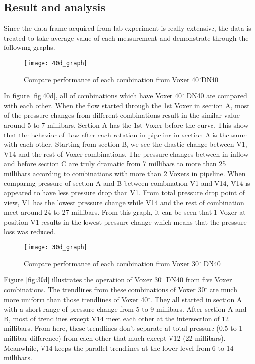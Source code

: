 \subsection{Result and analysis}
Since the data frame acquired from lab experiment is really extensive, the data is treated to take average value of each measurement and demonstrate through the following graphs.
\begin{figure}[h]
  \centering
  \texttt{[image: 40d\_graph]}
  \caption{ Compare performance of each combination from Voxer 40$^{\circ}$DN40}
  \label{fig:40d}
\end{figure}
In figure \vref{fig:40d}, all of combinations which have Voxer 40$^{\circ}$ DN40 are compared with each other. When the flow started through the 1st Voxer in section A, most of the pressure changes from different combinations result in the similar value around 5 to 7 millibars. Section A has the 1st Voxer before the curve. This show that the behavior of flow after each rotation in pipeline in section A is the same with each other. Starting from section B, we see the drastic change between V1, V14 and the rest of Voxer combinations. The pressure changes between in inflow and before section C are truly dramatic from 7 millibars to more than 25 millibars according to combinations with more than 2 Voxers in pipeline. When comparing pressure of section A and B between combination V1 and V14, V14 is appeared to have less pressure drop than V1. From total pressure drop point of view, V1 has the lowest pressure change while V14 and the rest of combination meet around 24 to 27 millibars. From this graph, it can be seen that 1 Voxer at position V1 results in the lowest pressure change which means that the pressure loss was reduced. 
\begin{figure}[h]
  \centering
  \texttt{[image: 30d\_graph]}
  \caption{Compare performance of each combination from Voxer 30$^{\circ}$ DN40}
  \label{fig:30d}
\end{figure}
Figure \vref{fig:30d} illustrates the operation of Voxer 30$^{\circ}$ DN40 from five Voxer combinations. The trendlines from these combinations of Voxer 30$^{\circ}$ are much more uniform than those trendlines of Voxer 40$^{\circ}$. They all started in section A with a short range of pressure change from 5 to 9 millibars. After section A and B, most of trendlines except V14 meet each other at the intersection of 12 millibars. From here, these trendlines don't separate at total pressure (0.5 to 1 millibar difference) from each other that much except V12 (22 millibars). Meanwhile, V14 keeps the parallel trendlines at the lower level from 6 to 14 millibars.
